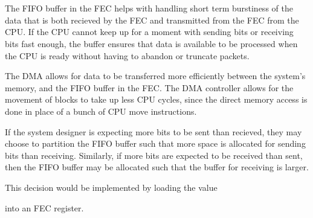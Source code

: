 \section{}

The FIFO buffer in the FEC helps with handling short term burstiness of the data
that is both recieved by the FEC and transmitted from the FEC from the CPU. If
the CPU cannot keep up for a moment with sending bits or receiving bits fast
enough, the buffer ensures that data is available to be processed when the CPU
is ready without having to abandon or truncate packets. 


The DMA allows for data to be transferred more efficiently between the system's
memory, and the FIFO buffer in the FEC. The DMA controller allows for the
movement of blocks to take up less CPU cycles, since the direct memory access is
done in place of a bunch of CPU move instructions.

If the system designer is expecting more bits to be sent than recieved, they may
choose to partition the FIFO buffer such that more space is allocated for
sending bits than receiving. Similarly, if more bits are expected to be received
than sent, then the FIFO buffer may be allocated such that the buffer for
receiving is larger. 

This decision would be implemented by loading the value 


into an FEC register.
